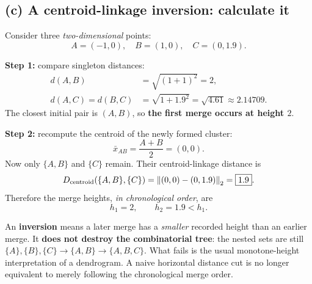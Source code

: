 \subsection*{(c) A centroid-linkage inversion: calculate it}\label{sec:centroid-inversion}
Consider three \emph{two-dimensional} points:
\[
A=(-1,0),\quad B=(1,0),\quad C=(0,1.9).
\]
\begin{center}
\end{center}
\textbf{Step 1:} compare singleton distances:
\[
\begin{aligned}
d(A,B)&=\sqrt{(1+1)^2}=\boxed{2},\\
d(A,C)=d(B,C)&=\sqrt{1+1.9^2}=\sqrt{4.61}\approx\boxed{2.14709}.
\end{aligned}
\]
The closest initial pair is $(A,B)$, so \textbf{the first merge occurs at height $2$}.

\textbf{Step 2:} recompute the centroid of the newly formed cluster:
\[
\bar x_{AB}=\frac{A+B}{2}=(0,0).
\]
Now only $\{A,B\}$ and $\{C\}$ remain. Their centroid-linkage distance is
\[
D_{\rm centroid}(\{A,B\},\{C\})=\left\lVert(0,0)-(0,1.9)\right\rVert_2=\boxed{1.9}.
\]
Therefore the merge heights, \emph{in chronological order}, are
\[
\boxed{h_1=2,\qquad h_2=1.9<h_1.}
\]
\begin{important}
An \textbf{inversion} means a later merge has a \emph{smaller} recorded height than an earlier merge. It \textbf{does not destroy the combinatorial tree}: the nested sets are still $\{A\},\{B\},\{C\}\rightarrow\{A,B\}\rightarrow\{A,B,C\}$. What fails is the usual monotone-height interpretation of a dendrogram. A naive horizontal distance cut is no longer equivalent to merely following the chronological merge order.
\end{important}

